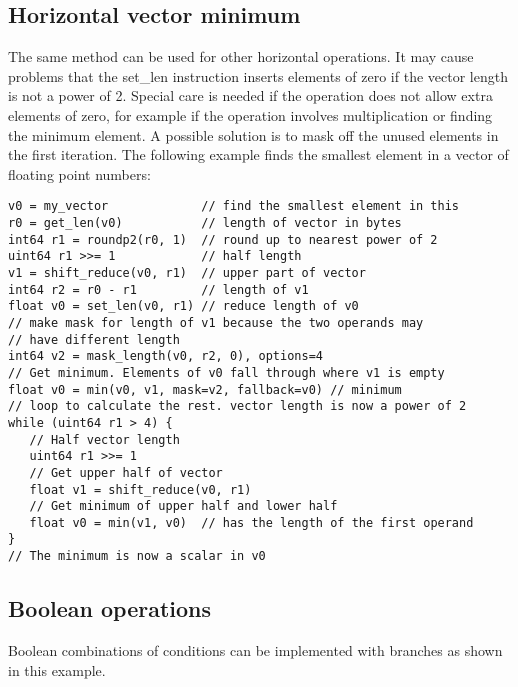 \documentclass[forwardcom.tex]{subfiles}
\begin{document}
\subsection{Horizontal vector minimum} \label{horizontalVectorMin}
The same method can be used for other horizontal operations. It may cause problems that the set\_len instruction inserts elements of zero if the vector length is not a power of 2. Special care is needed if the operation does not allow extra elements of zero, for example if the operation involves multiplication or finding the minimum element. A possible solution is to mask off the unused elements in the first iteration. The following example finds the smallest element in a vector of floating point numbers:

\begin{example}
\label{exampleHorizontalMin}
\end{example}
\begin{lstlisting}[frame=single]
v0 = my_vector             // find the smallest element in this
r0 = get_len(v0)           // length of vector in bytes
int64 r1 = roundp2(r0, 1)  // round up to nearest power of 2
uint64 r1 >>= 1            // half length
v1 = shift_reduce(v0, r1)  // upper part of vector
int64 r2 = r0 - r1         // length of v1
float v0 = set_len(v0, r1) // reduce length of v0
// make mask for length of v1 because the two operands may 
// have different length
int64 v2 = mask_length(v0, r2, 0), options=4
// Get minimum. Elements of v0 fall through where v1 is empty
float v0 = min(v0, v1, mask=v2, fallback=v0) // minimum
// loop to calculate the rest. vector length is now a power of 2
while (uint64 r1 > 4) {
   // Half vector length
   uint64 r1 >>= 1
   // Get upper half of vector
   float v1 = shift_reduce(v0, r1)
   // Get minimum of upper half and lower half
   float v0 = min(v1, v0)  // has the length of the first operand
}
// The minimum is now a scalar in v0
\end{lstlisting}
\vspace{4mm}




\subsection{Boolean operations} \label{BooleanOperations}
Boolean combinations of conditions can be implemented with branches as shown in this example.
\vv
\end{document}
